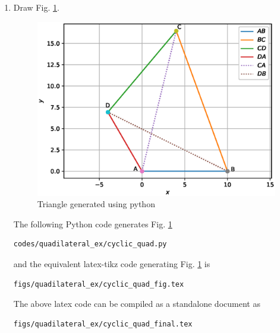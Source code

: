 \begin{enumerate}[label=\thesubsection.\arabic*.,ref=\thesubsection.\theenumi]
\item Draw Fig. \ref{fig:cyclic_quad2_quadilateral_ex}.

\begin{figure}[!ht]
\centering
\includegraphics[width=\columnwidth]{./figs/quadilateral_ex/cyclic_quad.eps}
\caption{Triangle generated using python}
\label{fig:cyclic_quad2_quadilateral_ex}
\end{figure} 

\solution The  following Python code generates Fig. \ref{fig:cyclic_quad2_quadilateral_ex}

\begin{lstlisting}
codes/quadilateral_ex/cyclic_quad.py
\end{lstlisting}

and the equivalent latex-tikz code generating Fig. \ref{fig:cyclic_quad2_quadilateral_ex} is 
\begin{lstlisting}
figs/quadilateral_ex/cyclic_quad_fig.tex
\end{lstlisting}
%
The above latex code can be compiled as a standalone document as
\begin{lstlisting}
figs/quadilateral_ex/cyclic_quad_final.tex
\end{lstlisting}
\end{enumerate}

